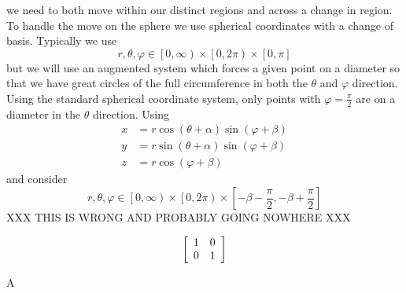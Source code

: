\documentclass[a4paper,10pt]{article}
\begin{document}
we need to both move within our distinct
regions and across a change in region. To handle the move on the sphere
we use spherical coordinates with a change of basis. Typically we use
\[r, \theta, \varphi \in \left[0, \infty\right) \times \left[0, 2\pi\right)
\times \left[0, \pi\right]\]
but we will use an augmented system which forces a given point on a diameter
so that we have great circles of the full circumference in both the
\(\theta\) and \(\varphi\) direction. Using the standard spherical
coordinate  system, only points with \(\varphi = \frac{\pi}{2}\) are on
a diameter in the \(\theta\) direction. Using
\begin{align*}
x &= r \cos \left(\theta + \alpha\right) \sin \left(\varphi + \beta\right) \\
y &= r \sin \left(\theta + \alpha\right) \sin \left(\varphi + \beta\right) \\
z &= r \cos \left(\varphi + \beta\right)
\end{align*}
and consider
\[r, \theta, \varphi \in \left[0, \infty\right) \times \left[0, 2\pi\right)
\times \left[-\beta - \frac{\pi}{2}, -\beta + \frac{\pi}{2}\right]\]
XXX THIS IS WRONG AND PROBABLY GOING NOWHERE XXX

\[\left[ \begin{array}{c c}
1 & 0 \\
0 & 1
\end{array}\right]\]


A
\end{document}
